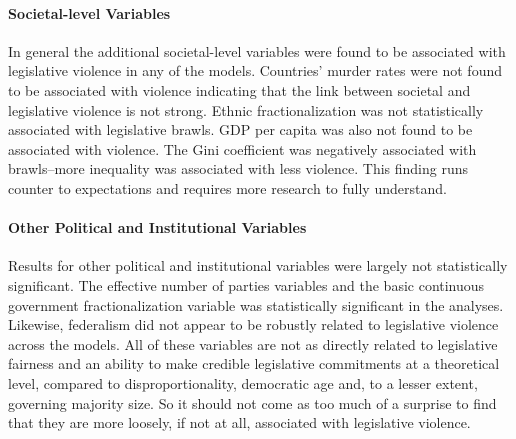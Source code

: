 \documentclass[a4paper]{article}\usepackage[]{graphicx}\usepackage[]{color}
\begin{document}

\paragraph{Societal-level Variables}

In general the additional societal-level variables were found to be associated with legislative violence in any of the models. Countries' murder rates were not found to be associated with violence indicating that the link between societal and legislative violence is not strong. Ethnic fractionalization was not statistically associated with legislative brawls. GDP per capita was also not found to be associated with violence. The Gini coefficient was negatively associated with brawls--more inequality was associated with less violence. This finding runs counter to expectations and requires more research to fully understand.

\paragraph{Other Political and Institutional Variables}

Results for other political and institutional variables were largely not statistically significant. The effective number of parties variables and the basic continuous government fractionalization variable was statistically significant in the analyses. Likewise, federalism did not appear to be robustly related to legislative violence across the models. All of these variables are not as directly related to legislative fairness and an ability to make credible legislative commitments at a theoretical level, compared to disproportionality, democratic age and, to a lesser extent, governing majority size. So it should not come as too much of a surprise to find that they are more loosely, if not at all, associated with legislative violence.
\end{document}
